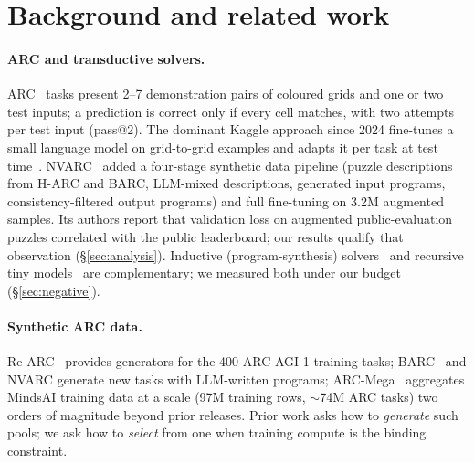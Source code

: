 \documentclass[11pt]{article}
\newcommand{\nvarc}{NVARC}
\newcommand{\mega}{ARC-Mega}
\begin{document}
\section{Background and related work}
\paragraph{ARC and transductive solvers.}
ARC~\citep{chollet2019measure} tasks present 2--7 demonstration pairs of coloured grids and one or two test inputs; a prediction is correct only if every cell matches, with two attempts per test input (pass@2). The dominant Kaggle approach since 2024 fine-tunes a small language model on grid-to-grid examples and adapts it per task at test time~\citep{franzen2024architects,akyurek2024ttt,franzen2025architects}. \nvarc{}~\citep{nvarc2025} added a four-stage synthetic data pipeline (puzzle descriptions from H-ARC and BARC, LLM-mixed descriptions, generated input programs, consistency-filtered output programs) and full fine-tuning on 3.2M augmented samples. Its authors report that validation loss on augmented public-evaluation puzzles correlated with the public leaderboard; our results qualify that observation (\S\ref{sec:analysis}). Inductive (program-synthesis) solvers~\citep{li2024induction,hodel2024rearc,wind2020icecuber} and recursive tiny models~\citep{jolicoeur2025trm} are complementary; we measured both under our budget (\S\ref{sec:negative}).

\paragraph{Synthetic ARC data.}
Re-ARC~\citep{hodel2024rearc} provides generators for the 400 ARC-AGI-1 training tasks; BARC~\citep{li2024induction} and \nvarc{} generate new tasks with LLM-written programs; \mega{}~\citep{arcmega2025} aggregates MindsAI training data at a scale (97M training rows, $\sim$74M ARC tasks) two orders of magnitude beyond prior releases. Prior work asks how to \emph{generate} such pools; we ask how to \emph{select} from one when training compute is the binding constraint.
\end{document}
